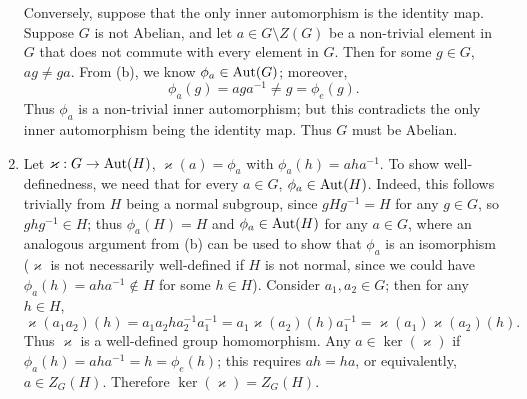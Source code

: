 \documentclass{homework}
\begin{document}
\begin{solution}
\begin{enumerate}[label=(\alph*)]
    Conversely, suppose that the only inner automorphism is the identity map. Suppose $G$ is not
    Abelian, and let $a\in G\setminus Z(G)$ be a non-trivial element in $G$ that does not commute
    with every element in $G$. Then for some $g\in G$, $ag\neq ga$. From (b), we know $\phi_a\in
    \operatorname{Aut}(G)$; moreover, \[
      \phi_a(g)=aga^{-1}\neq g=\phi_e(g)
    .\] Thus $\phi_a$ is a non-trivial inner automorphism; but this contradicts the only inner
    automorphism being the identity map. Thus $G$ must be Abelian.
  \item Let $\varkappa: G\to \operatorname{Aut}(H)$, $\varkappa(a)=\phi_a$ with $\phi_a(h)=aha^{-1}$. To show
    well-definedness, we need that for every $a\in G$, $\phi_a\in \operatorname{Aut}(H)$. Indeed, this follows
    trivially from $H$ being a normal subgroup, since $gHg^{-1}=H$ for any $g\in G$, so $ghg^{-1}\in
    H$; thus $\phi_a(H)=H$ and $\phi_a\in \operatorname{Aut}(H)$ for any $a\in G$, where an analogous argument
    from (b) can be used to show that $\phi_a$ is an isomorphism ($\varkappa$ is not necessarily
    well-defined if $H$ is not normal, since we could have $\phi_a(h)=aha^{-1}\not\in H$ for some
    $h\in H$). Consider $a_1,a_2\in G$; then for any $h\in H$, \[
      \varkappa(a_1a_2)(h)=a_1a_2ha_2^{-1}a_1^{-1}=a_1\varkappa(a_2)(h)a_1^{-1}=\varkappa(a_1)\varkappa(a_2)(h)
    .\] Thus $\varkappa$ is a well-defined group homomorphism. Any $a\in \ker{(\varkappa)}$ if
    $\phi_a(h)=aha^{-1}=h=\phi_e(h)$; this requires $ah=ha$, or equivalently, $a\in Z_G(H)$.
    Therefore $\ker{(\varkappa)}=Z_G(H)$.
  \end{enumerate}
\end{solution}
\end{document}
